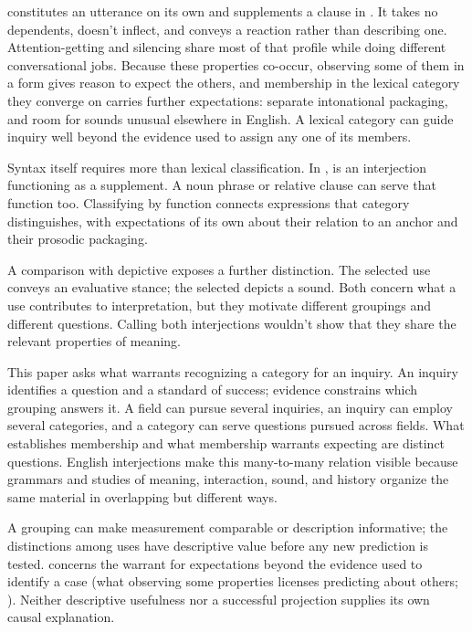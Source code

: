 \documentclass[12pt]{article}
\begin{document}
 constitutes an utterance on its own and supplements a
clause in . It takes no dependents, doesn't
inflect, and conveys a reaction rather than describing one.
Attention-getting  and silencing  share most of
that profile while doing different conversational jobs. Because these
properties co-occur, observing some of them in a form gives reason to
expect the others, and membership in the lexical category they converge on
carries further expectations: separate intonational packaging, and room for
sounds unusual elsewhere in English. A lexical category can guide inquiry
well beyond the evidence used to assign any one of its members.

Syntax itself requires more than lexical classification. In
,  is an
interjection functioning as a supplement. A noun phrase or relative
clause can serve that function too. Classifying by function connects
expressions that category distinguishes, with expectations of its own
about their relation to an anchor and their prosodic packaging.

A comparison with depictive  exposes a further distinction.
The selected  use conveys an evaluative stance; the selected
 depicts a sound. Both concern what a use contributes to
interpretation, but they motivate different groupings and different
questions. Calling both interjections wouldn't show that they share the
relevant properties of meaning.

This paper asks what warrants recognizing a category for an inquiry.
An inquiry identifies a question and a standard of success; evidence
constrains which grouping answers it. A field can pursue several inquiries,
an inquiry can employ several categories, and a category can serve questions
pursued across fields. What establishes membership and what membership
warrants expecting are distinct questions. English interjections make this
many-to-many relation visible because grammars and studies of meaning,
interaction, sound, and history organize the same material in overlapping
but different ways.

A grouping can make measurement comparable or description informative;
the distinctions among  uses have descriptive value before
any new prediction is tested.  concerns the warrant
for expectations beyond the evidence used to identify a case (what
observing some properties licenses predicting about others;
\citealp{Goodman1955}). Neither descriptive usefulness nor a successful
projection supplies its own causal explanation.
\end{document}
